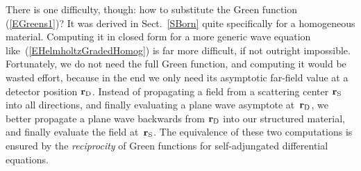There is one difficulty, though:
how to substitute the Green function (\ref{EGreens1})?
It was derived in Sect.~\ref{SBorn} quite specifically
for a homogeneous material.
Computing it in closed form for a more generic wave equation
like~(\ref{EHelmholtzGradedHomog}) is far more difficult,
if not outright impossible.
Fortunately, we do not need the full Green function,
and computing it would be wasted effort,
because in the end
we only need its asymptotic far-field value at a detector position $\mathbf{r}_{\rm D}$.
Instead of propagating a field from a scattering center $\mathbf{r}_{\rm S}$
into all directions, and finally evaluating a plane wave asymptote at~$\mathbf{r}_{\rm D}$,
we better propagate a plane wave backwards from $\mathbf{r}_{\rm D}$
into our structured material,
and finally evaluate the field at~$\mathbf{r}_{\rm S}$.
The equivalence of these two computations is ensured
by the \textit{reciprocity}
of Green functions for self-adjungated differential equations.

